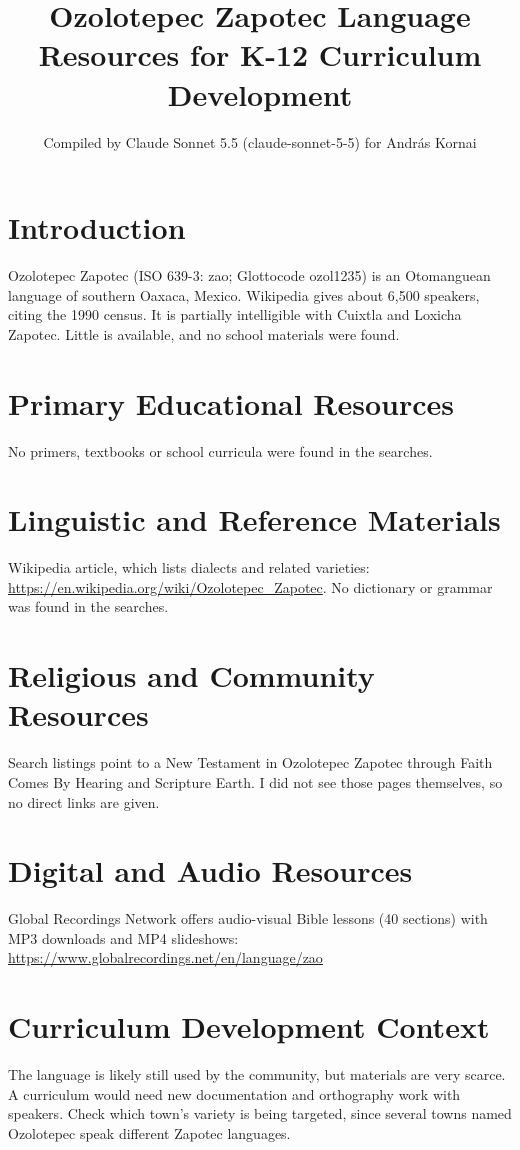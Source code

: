 \documentclass[12pt]{article}
\title{Ozolotepec Zapotec Language Resources for K-12 Curriculum Development}
\author{Compiled by Claude Sonnet 5.5 (claude-sonnet-5-5) for Andr\'as Kornai}
\date{}
\begin{document}
\maketitle

\section{Introduction}
Ozolotepec Zapotec (ISO 639-3: zao; Glottocode ozol1235) is an Otomanguean language of southern Oaxaca, Mexico. Wikipedia gives about 6,500 speakers, citing the 1990 census. It is partially intelligible with Cuixtla and Loxicha Zapotec. Little is available, and no school materials were found.

\section{Primary Educational Resources}
No primers, textbooks or school curricula were found in the searches.

\section{Linguistic and Reference Materials}
Wikipedia article, which lists dialects and related varieties: \url{https://en.wikipedia.org/wiki/Ozolotepec_Zapotec}. No dictionary or grammar was found in the searches.

\section{Religious and Community Resources}
Search listings point to a New Testament in Ozolotepec Zapotec through Faith Comes By Hearing and Scripture Earth. I did not see those pages themselves, so no direct links are given.

\section{Digital and Audio Resources}
Global Recordings Network offers audio-visual Bible lessons (40 sections) with MP3 downloads and MP4 slideshows: \url{https://www.globalrecordings.net/en/language/zao}

\section{Curriculum Development Context}
The language is likely still used by the community, but materials are very scarce. A curriculum would need new documentation and orthography work with speakers. Check which town's variety is being targeted, since several towns named Ozolotepec speak different Zapotec languages.
\end{document}
